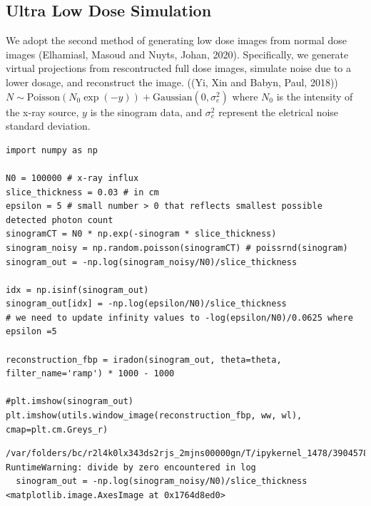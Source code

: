 \documentclass[a4paper, 11pt]{article}
\begin{document}
\subsection{Ultra Low Dose Simulation}
\label{sec:org6ab8f3c}
We adopt the second method of generating low dose images from normal dose images (Elhamiasl, Masoud and Nuyts, Johan, 2020). Specifically, we generate virtual projections from rescontructed full dose images, simulate noise due to a lower dosage, and reconstruct the image.
((Yi, Xin and Babyn, Paul, 2018)) \(N\sim \text{Poisson}(N_0 \exp(-y)) + \text{Gaussian}(0, \sigma_e^2)\) where \(N_0\) is the intensity of the x-ray source, \(y\) is the sinogram data, and \(\sigma_e^2\) represent the eletrical noise standard deviation.
\begin{verbatim}
import numpy as np

N0 = 100000 # x-ray influx
slice_thickness = 0.03 # in cm
epsilon = 5 # small number > 0 that reflects smallest possible detected photon count
sinogramCT = N0 * np.exp(-sinogram * slice_thickness)
sinogram_noisy = np.random.poisson(sinogramCT) # poissrnd(sinogram)
sinogram_out = -np.log(sinogram_noisy/N0)/slice_thickness

idx = np.isinf(sinogram_out)
sinogram_out[idx] = -np.log(epsilon/N0)/slice_thickness
# we need to update infinity values to -log(epsilon/N0)/0.0625 where epsilon =5

reconstruction_fbp = iradon(sinogram_out, theta=theta, filter_name='ramp') * 1000 - 1000

#plt.imshow(sinogram_out)
plt.imshow(utils.window_image(reconstruction_fbp, ww, wl), cmap=plt.cm.Greys_r)
\end{verbatim}

\begin{verbatim}
/var/folders/bc/r2l4k0lx343ds2rjs_2mjns00000gn/T/ipykernel_1478/3904578395.py:8: RuntimeWarning: divide by zero encountered in log
  sinogram_out = -np.log(sinogram_noisy/N0)/slice_thickness
<matplotlib.image.AxesImage at 0x1764d8ed0>
\end{verbatim}
\end{document}
